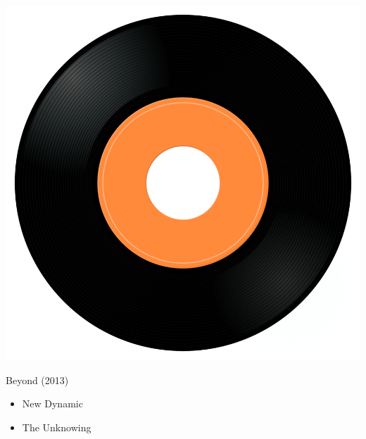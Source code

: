 \begin{minipage}[t]{0.25\textwidth}\vspace{0pt}
\captionsetup{type=figure}
\includegraphics[width=\textwidth]{Images/cover.png}
\caption*{Beyond (2013)}
\end{minipage}
\begin{minipage}[t]{0.25\textwidth}\vspace{0pt}
\begin{itemize}[nosep,leftmargin=1em,labelwidth=*,align=left]
	\setlength{\itemsep}{0pt}
	\item New Dynamic
	\item The Unknowing
\end{itemize}
\end{minipage}
